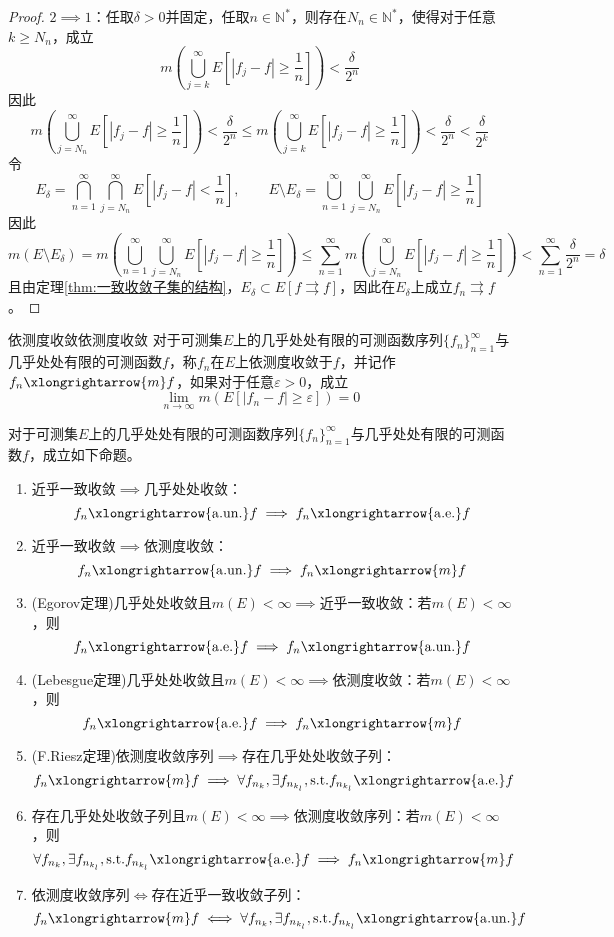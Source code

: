 \documentclass[lang = cn, scheme = chinese, thmcnt = section]{elegantbook}
\newcommand{\N}{\mathbb{N}}            %
\newcommand{\sub}{\subset}             %
\newcommand{\toae}{\xlongrightarrow{\mathrm{a.e.}}}
\newcommand{\toaun}{\xlongrightarrow{\mathrm{a.un.}}}
\newcommand{\tom}{\xlongrightarrow{m}}
\begin{document}
\begin{proof}
	$2\implies 1$：任取$\delta>0$并固定，任取$n\in\N^*$，则存在$N_n\in\N^*$，使得对于任意$k\ge N_n$，成立%
	$$
	m\left(\bigcup_{j=k}^{\infty}E\left[|f_j-f|\ge\frac{1}{n}\right]\right)<\frac{\delta}{2^n}
	$$
	因此
	$$
	m\left(\bigcup_{j=N_n}^{\infty}E\left[|f_j-f|\ge\frac{1}{n}\right]\right)<\frac{\delta}{2^n}\le m\left(\bigcup_{j=k}^{\infty}E\left[|f_j-f|\ge\frac{1}{n}\right]\right)<\frac{\delta}{2^n}<\frac{\delta}{2^k}
	$$
	令%
	$$
	E_\delta
	=\bigcap_{n=1}^{\infty}\bigcap_{j=N_n}^{\infty}E\left[|f_j-f|<\frac{1}{n}\right]
	,\qquad
	E\setminus E_\delta
	=\bigcup_{n=1}^{\infty}\bigcup_{j=N_n}^{\infty}E\left[|f_j-f|\ge\frac{1}{n}\right]
	$$
	因此%
	$$
	m(E\setminus E_\delta)
	=m\left(\bigcup_{n=1}^{\infty}\bigcup_{j=N_n}^{\infty}E\left[|f_j-f|\ge\frac{1}{n}\right]\right)
	\le \sum_{n=1}^{\infty}m\left(\bigcup_{j=N_n}^{\infty}E\left[|f_j-f|\ge\frac{1}{n}\right]\right)
	<\sum_{n=1}^{\infty}\frac{\delta}{2^n}
	=\delta
	$$
	且由定理\ref{thm:一致收敛子集的结构}，$E_\delta\sub E[f\rightrightarrows f]$，因此在$E_\delta$上成立$f_n\rightrightarrows f$。
\end{proof}

\begin{definition}{依测度收敛}{依测度收敛}
	对于可测集$E$上的几乎处处有限的可测函数序列$\{f_n\}_{n=1}^{\infty}$与几乎处处有限的可测函数$f$，称$f_n$在$E$上依测度收敛于$f$，并记作$f_n\tom f$，如果对于任意$\varepsilon>0$，成立
	$$
	\lim_{n\to\infty}m(E[|f_n-f|\ge\varepsilon])=0
	$$
\end{definition}

\begin{theorem}
	对于可测集$E$上的几乎处处有限的可测函数序列$\{f_n\}_{n=1}^{\infty}$与几乎处处有限的可测函数$f$，成立如下命题。
	\begin{enumerate}
		\item 近乎一致收敛$\implies$几乎处处收敛：
		$$
		f_n\toaun f
		\implies
		f_n\toae f
		$$
		\item 近乎一致收敛$\implies$依测度收敛：
		$$
		f_n\toaun f
		\implies
		f_n\tom f
		$$
		\item (Egorov定理)几乎处处收敛且$m(E)<\infty\implies$近乎一致收敛：若$m(E)<\infty$，则
		$$
		f_n\toae f\implies
		f_n\toaun f
		$$
		\item (Lebesgue定理)几乎处处收敛且$m(E)<\infty\implies$依测度收敛：若$m(E)<\infty$，则
		$$
		f_n\toae f\implies
		f_n\tom f
		$$
		\item (F.Riesz定理)依测度收敛序列$\implies$存在几乎处处收敛子列：
		$$
		f_n\tom f\implies
		\forall f_{n_k},\exists f_{n_{k_l}},\text{s.t.}f_{n_{k_l}}\toae f
		$$
		\item 存在几乎处处收敛子列且$m(E)<\infty\implies$依测度收敛序列：若$m(E)<\infty$，则
		$$
		\forall f_{n_k},\exists f_{n_{k_l}},\text{s.t.}f_{n_{k_l}}\toae f\implies f_n\tom f
		$$
		\item 依测度收敛序列$\iff$存在近乎一致收敛子列：
		$$
		f_n\tom f\iff
		\forall f_{n_k},\exists f_{n_{k_l}},\text{s.t.}f_{n_{k_l}}\toaun f
		$$
	\end{enumerate}
\end{theorem}
\end{document}
